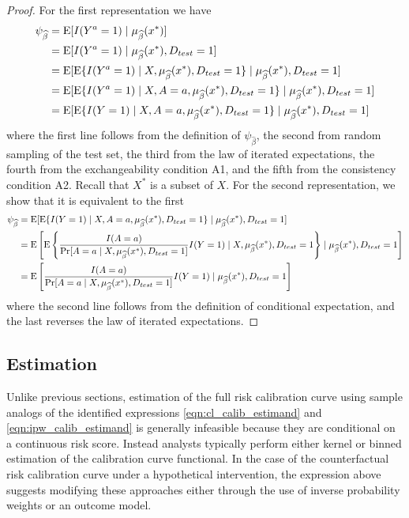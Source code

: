 \begin{proof}
    For the first representation we have 
    \begin{align*}
        \psi_{\widehat{\beta}} &= \operatorname{E}[I(Y^a = 1) \mid \mu_{\widehat{\beta}}(x^*)] \\
        & = \operatorname{E}[I(Y^a = 1) \mid \mu_{\widehat{\beta}}(x^*), D_{test} = 1] \\
        & = \operatorname{E}[\operatorname{E}\{I(Y^a = 1) \mid X, \mu_{\widehat{\beta}}(x^*), D_{test} = 1\}\mid \mu_{\widehat{\beta}}(x^*), D_{test} = 1] \\
        & = \operatorname{E}[\operatorname{E}\{I(Y^a = 1) \mid X, A = a, \mu_{\widehat{\beta}}(x^*), D_{test} = 1\}\mid \mu_{\widehat{\beta}}(x^*), D_{test} = 1] \\
        & = \operatorname{E}[\operatorname{E}\{I(Y = 1) \mid X, A = a, \mu_{\widehat{\beta}}(x^*), D_{test} = 1\}\mid \mu_{\widehat{\beta}}(x^*), D_{test} = 1]
    \end{align*}
    where the first line follows from the definition of $\psi_{\widehat{\beta}}$, the second from random sampling of the test set, the third from the law of iterated expectations, the fourth from the exchangeability condition A1, and the fifth from the consistency condition A2. Recall that $X^*$ is a subset of $X$. For the second representation, we show that it is equivalent to the first 
    \begin{align*}
        \psi_{\widehat{\beta}} &= \operatorname{E}[\operatorname{E}\{I(Y = 1) \mid X, A = a, \mu_{\widehat{\beta}}(x^*), D_{test} = 1\}\mid \mu_{\widehat{\beta}}(x^*), D_{test} = 1] \\
        &= \operatorname{E}\left[\operatorname{E}\left\{\frac{I(A = a)}{\Pr[A = a \mid X, \mu_{\widehat{\beta}}(x^*), D_{test} = 1]} I(Y=1) \mid X, \mu_{\widehat{\beta}}(x^*), D_{test} = 1\right\}\mid \mu_{\widehat{\beta}}(x^*), D_{test} = 1\right] \\
        &= \operatorname{E}\left[\frac{I(A = a)}{\Pr[A = a \mid X, \mu_{\widehat{\beta}}(x^*), D_{test} = 1]} I(Y=1) \mid \mu_{\widehat{\beta}}(x^*), D_{test} = 1\right]
    \end{align*}
    where the second line follows from the definition of conditional expectation, and the last reverses the law of iterated expectations.
\end{proof}

\subsection{Estimation}
Unlike previous sections, estimation of the full risk calibration curve using sample analogs of the identified expressions \ref{eqn:cl_calib_estimand} and \ref{eqn:ipw_calib_estimand} is generally infeasible because they are conditional on a continuous risk score. Instead analysts typically perform either kernel or binned estimation of the calibration curve functional. In the case of the counterfactual risk calibration curve under a hypothetical intervention, the expression above suggests modifying these approaches either through the use of inverse probability weights or an outcome model. 


